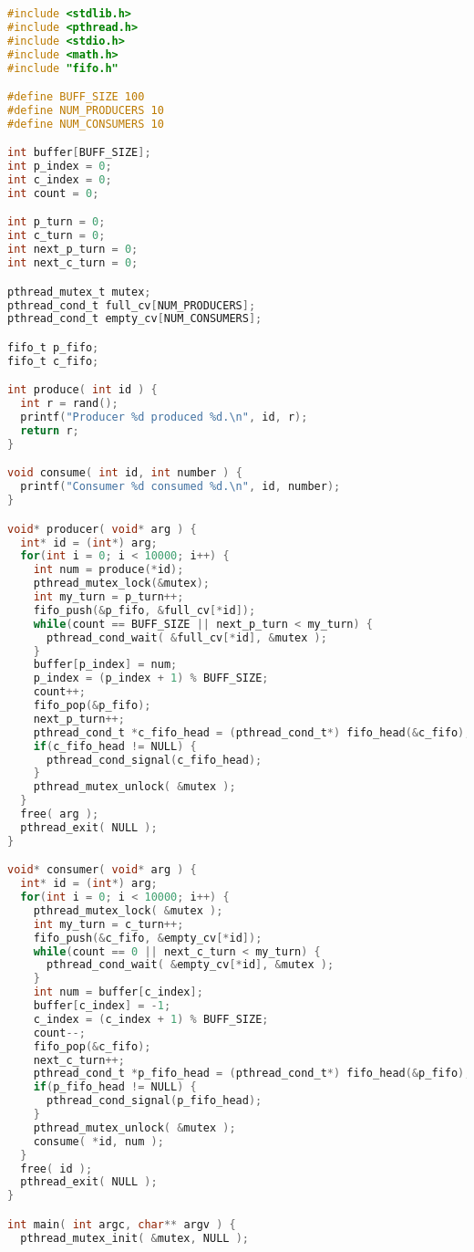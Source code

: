 \begin{lstlisting}[language=C]
#include <stdlib.h>
#include <pthread.h>
#include <stdio.h>
#include <math.h>
#include "fifo.h"

#define BUFF_SIZE 100
#define NUM_PRODUCERS 10
#define NUM_CONSUMERS 10

int buffer[BUFF_SIZE];
int p_index = 0;
int c_index = 0;
int count = 0;

int p_turn = 0;
int c_turn = 0;
int next_p_turn = 0;
int next_c_turn = 0;

pthread_mutex_t mutex;
pthread_cond_t full_cv[NUM_PRODUCERS];
pthread_cond_t empty_cv[NUM_CONSUMERS];

fifo_t p_fifo;
fifo_t c_fifo;

int produce( int id ) {
  int r = rand();
  printf("Producer %d produced %d.\n", id, r);
  return r;
}

void consume( int id, int number ) {
  printf("Consumer %d consumed %d.\n", id, number);
}

void* producer( void* arg ) {
  int* id = (int*) arg;
  for(int i = 0; i < 10000; i++) {
    int num = produce(*id);
    pthread_mutex_lock(&mutex);
    int my_turn = p_turn++;
    fifo_push(&p_fifo, &full_cv[*id]);
    while(count == BUFF_SIZE || next_p_turn < my_turn) {
      pthread_cond_wait( &full_cv[*id], &mutex );
    }
    buffer[p_index] = num;
    p_index = (p_index + 1) % BUFF_SIZE;
    count++;
    fifo_pop(&p_fifo);
    next_p_turn++;
    pthread_cond_t *c_fifo_head = (pthread_cond_t*) fifo_head(&c_fifo);
    if(c_fifo_head != NULL) {
      pthread_cond_signal(c_fifo_head);
    }
    pthread_mutex_unlock( &mutex );
  }
  free( arg );
  pthread_exit( NULL );
}

void* consumer( void* arg ) {
  int* id = (int*) arg;
  for(int i = 0; i < 10000; i++) {
    pthread_mutex_lock( &mutex );
    int my_turn = c_turn++;
    fifo_push(&c_fifo, &empty_cv[*id]);
    while(count == 0 || next_c_turn < my_turn) {
      pthread_cond_wait( &empty_cv[*id], &mutex );
    }
    int num = buffer[c_index];
    buffer[c_index] = -1;
    c_index = (c_index + 1) % BUFF_SIZE;
    count--;
    fifo_pop(&c_fifo);
    next_c_turn++;
    pthread_cond_t *p_fifo_head = (pthread_cond_t*) fifo_head(&p_fifo);
    if(p_fifo_head != NULL) {
      pthread_cond_signal(p_fifo_head);
    }
    pthread_mutex_unlock( &mutex );
    consume( *id, num );
  }
  free( id );
  pthread_exit( NULL );
}

int main( int argc, char** argv ) {
  pthread_mutex_init( &mutex, NULL );


\end{lstlisting}
